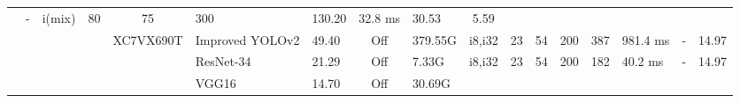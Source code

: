 \begin{table}
\begin{adjustbox}{totalheight=\baselineskip,}
\begin{tabular}{ccccclp{2em}cp{3em}cp{2em}p{4em}p{3em}p{3.5em}p{3.5em}p{2.5em}p{3em}}
                               &\multirow{1}{*}{-}
                                   &\multirow{1}{*}{i(mix)}
                                       &\multirow{1}{*}{80}
                                           &\multirow{1}{*}{75}
                                               &\multirow{1}{*}{300}
                                                   &\multirow{1}{*}{130.20}
                                                       &\multirow{1}{*}{32.8 ms}
                                                           &\multirow{1}{*}{30.53}
                                                               &\multirow{1}{*}{5.59}\\
\cmidrule{4-17}
   &   &   &\multirow{3}{*}{\cite{niAlgorithmHardwareCoOptimization2023}}
               &\multirow{3}{*}{XC7VX690T}
                   &\multirow{1}{*}{Improved YOLOv2}
                       &\multirow{1}{*}{49.40}
                           &\multirow{1}{*}{Off}
                               &\multirow{1}{*}{379.55G}
                                   &\multirow{1}{*}{i8,i32}
                                       &\multirow{1}{*}{23}
                                           &\multirow{1}{*}{54}
                                               &\multirow{1}{*}{200}
                                                   &\multirow{1}{*}{387}
                                                       &\multirow{1}{*}{981.4 ms}
                                                           &\multirow{1}{*}{-}
                                                               &\multirow{1}{*}{14.97}\\
   &   &   &   &   &\multirow{1}{*}{ResNet-34}
                       &\multirow{1}{*}{21.29}
                           &\multirow{1}{*}{Off}
                               &\multirow{1}{*}{7.33G}
                                   &\multirow{1}{*}{i8,i32}
                                       &\multirow{1}{*}{23}
                                           &\multirow{1}{*}{54}
                                               &\multirow{1}{*}{200}
                                                   &\multirow{1}{*}{182}
                                                       &\multirow{1}{*}{40.2 ms}
                                                           &\multirow{1}{*}{-}
                                                               &\multirow{1}{*}{14.97}\\
   &   &   &   &   &\multirow{1}{*}{VGG16}
                       &\multirow{1}{*}{14.70}
                           &\multirow{1}{*}{Off}
                               &\multirow{1}{*}{30.69G}

\end{tabular}
\end{adjustbox}
\end{table}
